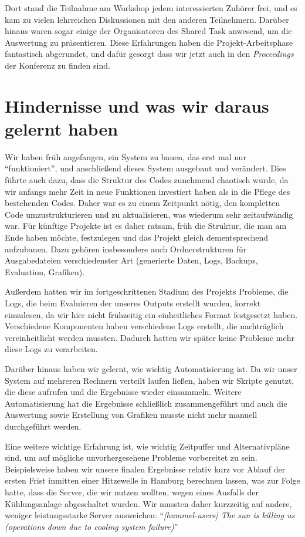 \documentclass[11pt,a4paper]{article}
\begin{document}
Dort stand die Teilnahme am Workshop jedem interessierten Zuhörer frei, und es kam zu vielen lehrreichen Diskussionen mit den anderen Teilnehmern. Darüber hinaus waren sogar einige der Organisatoren des Shared Task anwesend, um die Auswertung zu präsentieren. Diese Erfahrungen haben die Projekt-Arbeitsphase fantastisch abgerundet, und dafür gesorgt dass wir jetzt auch in den \textit{Proceedings} der Konferenz zu finden sind.

\section{Hindernisse und was wir daraus gelernt haben}
\label{sec:takeaway}
Wir haben früh angefangen, ein System zu bauen, das erst mal nur \enquote{funktioniert}, und anschließend dieses System ausgebaut und verändert. Dies führte auch dazu, dass die Struktur des Codes zunehmend chaotisch wurde, da wir anfangs mehr Zeit in neue Funktionen investiert haben als in die Pflege des bestehenden Codes. Daher war es zu einem Zeitpunkt nötig, den kompletten Code umzustrukturieren und zu aktualisieren, was wiederum sehr zeitaufwändig war. Für künftige Projekte ist es daher ratsam, früh die Struktur, die man am Ende haben möchte, festzulegen und das Projekt gleich dementsprechend aufzubauen. Dazu gehören insbesondere auch Ordnerstrukturen für Ausgabedateien verschiedenster Art (generierte Daten, Logs, Backups, Evaluation, Grafiken).

Außerdem hatten wir im fortgeschrittenen Stadium des Projekts Probleme, die Logs, die beim Evaluieren der unseres Outputs erstellt wurden, korrekt einzulesen, da wir hier nicht frühzeitig ein einheitliches Format festgesetzt haben. Verschiedene Komponenten haben verschiedene Logs erstellt, die nachträglich vereinheitlicht werden mussten. Dadurch hatten wir später keine Probleme mehr diese Logs zu verarbeiten.

Darüber hinaus haben wir gelernt, wie wichtig Automatisierung ist. Da wir unser System auf mehreren Rechnern verteilt laufen ließen, haben wir Skripte genutzt, die diese aufrufen und die Ergebnisse wieder einsammeln. Weitere Automatisierung hat die Ergebnisse schließlich zusammengeführt und auch die Auswertung sowie Erstellung von Grafiken musste nicht mehr manuell durchgeführt werden.

Eine weitere wichtige Erfahrung ist, wie wichtig Zeitpuffer und Alternativpläne sind, um auf mögliche unvorhergesehene Probleme vorbereitet zu sein. Beispielsweise haben wir unsere finalen Ergebnisse relativ kurz vor Ablauf der ersten Frist inmitten einer Hitzewelle in Hamburg berechnen lassen, was zur Folge hatte, dass die Server, die wir nutzen wollten, wegen eines Ausfalls der Kühlungsanlage abgeschaltet wurden. Wir mussten daher kurzzeitig auf andere, weniger leistungsstarke Server ausweichen:
\foreignquote{english}{\textit{[hummel-users] The sun is killing us (operations down due to cooling system failure)}}
\end{document}
